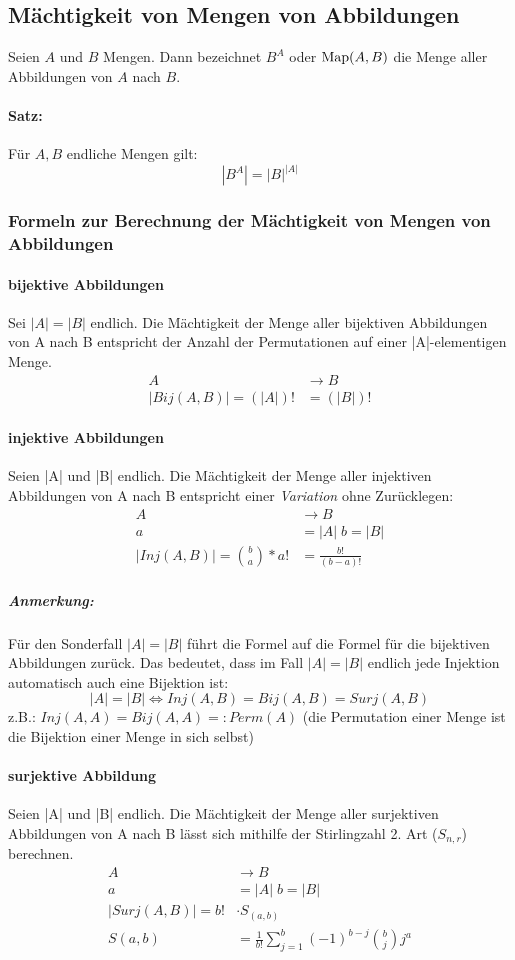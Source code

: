 \subsection{Mächtigkeit von Mengen von Abbildungen}
Seien $A$ und $B$ Mengen.
Dann bezeichnet $B^A$ oder $\text{Map}(A,B)$ die Menge aller Abbildungen von $A$
nach $B$. \paragraph*{Satz:}
Für $A, B$ endliche Mengen gilt:
$$ |B^A| = {|B|}^{|A|} $$

\subsubsection{Formeln zur Berechnung der Mächtigkeit von Mengen von Abbildungen}
\paragraph*{bijektive Abbildungen}
Sei $|A|=|B|$ endlich. Die Mächtigkeit der Menge aller bijektiven
Abbildungen von A nach B entspricht der Anzahl der Permutationen auf
einer |A|-elementigen Menge.
\begin{align*}
  A &\rightarrow B \\
  |Bij(A,B)| = (|A|)! &= (|B|)!
\end{align*}

\paragraph*{injektive Abbildungen}
Seien |A| und |B| endlich. Die Mächtigkeit der Menge aller injektiven
Abbildungen von A nach B entspricht einer \emph{Variation} ohne Zurücklegen:
\begin{align*}
  A &\rightarrow B \\
  a &= |A| \; b = |B| \\
  |Inj(A,B)| =  
{{b}\choose{a}} * a!
  &= \frac{b!}{(b-a)!}
\end{align*}

\subparagraph*{Anmerkung:} Für den Sonderfall $|A|=|B|$ führt die Formel auf die Formel für die bijektiven Abbildungen zurück. Das bedeutet, dass im Fall $|A|=|B|$ endlich jede Injektion
automatisch auch eine Bijektion ist:
$$|A|=|B| \Longleftrightarrow Inj(A,B) = Bij(A,B) = Surj(A,B)$$
z.B.: $ Inj(A,A) = Bij(A,A) =: Perm(A) $
(die Permutation einer Menge ist die Bijektion einer Menge in sich selbst)

\paragraph*{surjektive Abbildung}
Seien |A| und |B| endlich. Die Mächtigkeit der Menge aller surjektiven
Abbildungen von A nach B lässt sich mithilfe der
Stirlingzahl 2. Art ($S_{n,r}$) berechnen.
\begin{align*}
  A &\rightarrow B \\
  a &= |A| \; b = |B| \\
  |Surj(A,B)| = 
  b!    &\cdot S_{(a,b)}\\
  S(a,b)&=\frac{1}{b!}\sum_{j=1}^{b}(-1)^{b-j}{b \choose j}j^a
\end{align*}

